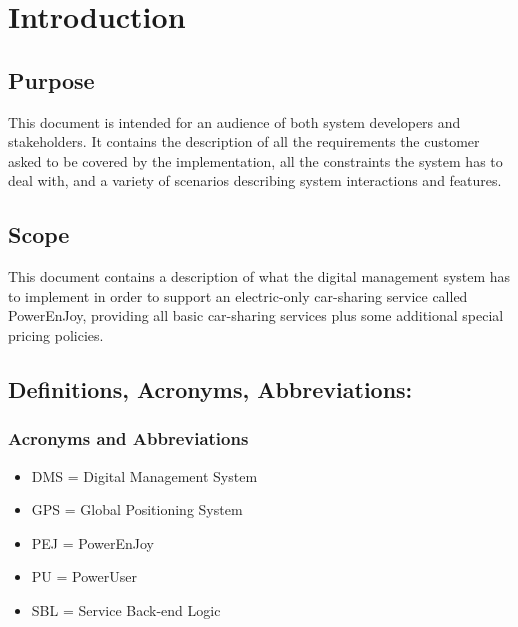 \section{Introduction}
\subsection{Purpose}
This document is intended for an audience of both system developers and stakeholders. It contains the description of all the requirements the customer asked to be covered by the implementation, all the constraints the system has to deal with, and a variety of scenarios describing system interactions and features.
\subsection{Scope}
This document contains a description of what the digital management system has to implement in order to support an electric-only car-sharing service called PowerEnJoy, providing all basic car-sharing services plus some additional special pricing policies.
\subsection{Definitions, Acronyms, Abbreviations:}
\subsubsection{Acronyms and Abbreviations}
\begin{itemize}
\item DMS = Digital Management System
\item GPS = Global Positioning System
\item PEJ = PowerEnJoy
\item PU = PowerUser
\item SBL = Service Back-end Logic
\end{itemize}
